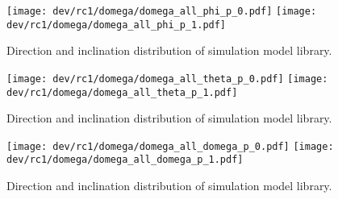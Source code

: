% 
% 
% 
\begin{figure}[p]
    \centering
    \texttt{[image: dev/rc1/domega/domega\_all\_phi\_p\_0.pdf]}
    \texttt{[image: dev/rc1/domega/domega\_all\_phi\_p\_1.pdf]}
    \caption[Boxplot]{Direction and inclination distribution of simulation model library. }
\end{figure}
% 
\begin{figure}[p]
    \centering
    \texttt{[image: dev/rc1/domega/domega\_all\_theta\_p\_0.pdf]}
    \texttt{[image: dev/rc1/domega/domega\_all\_theta\_p\_1.pdf]}
    \caption[Boxplot]{Direction and inclination distribution of simulation model library. }
\end{figure}
% 
\begin{figure}[p]
    \centering
    \texttt{[image: dev/rc1/domega/domega\_all\_domega\_p\_0.pdf]}
    \texttt{[image: dev/rc1/domega/domega\_all\_domega\_p\_1.pdf]}
    \caption[Boxplot]{Direction and inclination distribution of simulation model library. }
\end{figure}
% 
